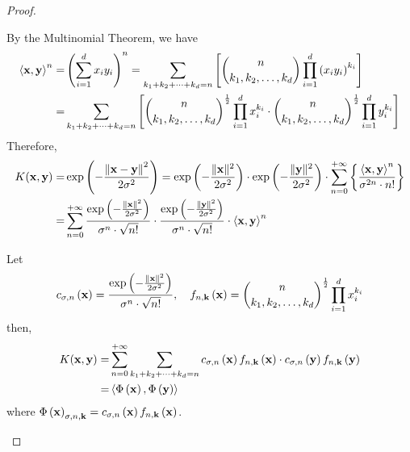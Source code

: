 \begin{proof}
\begin{enumerate}
		      By the Multinomial Theorem, we have
		      \begin{equation*}
			      \begin{aligned}
				      \left\langle{\bf x},\mathbf{y}\right\rangle^{n}= & \left(\sum_{i=1}^{d}x_{i}y_{i}\right)^{n}=\sum_{k_{1}+k_{2}+\cdots+k_{d}=n}\left[\binom{n}{k_{1},k_{2},\ldots,k_{d}}\prod_{i=1}^{d}\left(x_{i}y_{i}\right)^{k_{i}}\right]                                     \\
				      =                                             & \sum_{k_{1}+k_{2}+\cdots+k_{d}=n}\left[\binom{n}{k_{1},k_{2},\ldots,k_{d}}^{\frac{1}{2}}\prod_{i=1}^{d}x_{i}^{k_{i}}\cdot\binom{n}{k_{1},k_{2},\ldots,k_{d}}^{\frac{1}{2}}\prod_{i=1}^{d}y_{i}^{k_{i}}\right] \\
			      \end{aligned}
		      \end{equation*}
		      Therefore,
		      \begin{equation*}
			      \begin{aligned}
				      K({\bf x},\mathbf{y})= & \exp\left(-\frac{\left\|{\bf x}-\mathbf{y}\right\|^{2}}{2\sigma^{2}}\right)=\exp\left(-\frac{\|{\bf x}\|^{2}}{2\sigma^{2}}\right)\cdot\exp\left(-\frac{\|\mathbf{y}\|^{2}}{2\sigma^{2}}\right)\cdot\sum_{n=0}^{+\infty}\left\{\frac{\left\langle{\bf x},\mathbf{y}\right\rangle^{n}}{\sigma^{2n}\cdot n!}\right\} \\
				      =                   & \sum_{n=0}^{+\infty}\frac{\exp\left(-\frac{\|{\bf x}\|^{2}}{2\sigma^{2}}\right)}{\sigma^{n}\cdot\sqrt{n!}}\cdot\frac{\exp\left(-\frac{\|\mathbf{y}\|^{2}}{2\sigma^{2}}\right)}{\sigma^{n}\cdot\sqrt{n!}}\cdot\left\langle{\bf x},\mathbf{y}\right\rangle^{n}
			      \end{aligned}
		      \end{equation*}

		      Let
		      \begin{equation*}
			      c_{\sigma,n}\left({\bf x}\right)=\frac{\exp\left(-\frac{\|{\bf x}\|^{2}}{2\sigma^{2}}\right)}{\sigma^{n}\cdot\sqrt{n!}},\quad f_{n,\mathbf{k}}\left({\bf x}\right)=\binom{n}{k_{1},k_{2},\ldots,k_{d}}^{\frac{1}{2}}\prod_{i=1}^{d}x_{i}^{k_{i}}
		      \end{equation*}
		      then,
		      \begin{equation*}
			      \begin{aligned}
				      K({\bf x},\mathbf{y})= & \sum_{n=0}^{+\infty}\sum_{k_{1}+k_{2}+\cdots+k_{d}=n}c_{\sigma,n}\left({\bf x}\right)f_{n,\mathbf{k}}\left({\bf x}\right)\cdot c_{\sigma,n}\left(\mathbf{y}\right)f_{n,\mathbf{k}}\left(\mathbf{y}\right) \\
				      =                   & \left\langle\Phi\left({\bf x}\right),\Phi\left(\mathbf{y}\right)\right\rangle                                                                                                                          \\
			      \end{aligned}
		      \end{equation*}
		      where $\Phi\left({\bf x}\right)_{\sigma,n,\mathbf{k}}=c_{\sigma,n}\left({\bf x}\right)f_{n,\mathbf{k}}\left({\bf x}\right)$.


\end{enumerate}
\end{proof}
